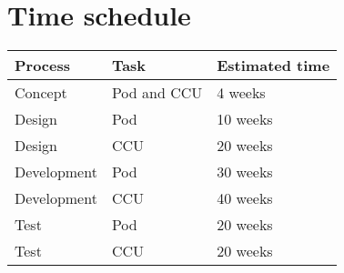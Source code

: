 
\chapter{Time schedule}

\begin{tabular}{b{4cm} b{4cm} b{4cm}}
    \textbf{Process} & \textbf{Task} & \textbf{Estimated time} \\
    \hline
    Concept & Pod and CCU & 4 weeks \\
    \hline
    Design & Pod & 10 weeks \\
    \hline
    Design & CCU & 20 weeks \\
    \hline
    Development & Pod & 30 weeks \\
    \hline
    Development & CCU & 40 weeks \\
    \hline
    Test & Pod & 20 weeks \\
    \hline
    Test & CCU & 20 weeks \\
\end{tabular}